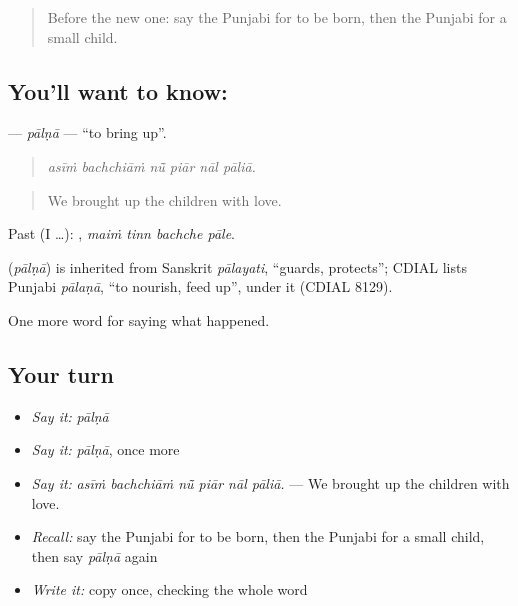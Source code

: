 \label{lesson:PA-C314-palna}



\begin{quote}
Before the new one: say the Punjabi for to be born, then the Punjabi for a small child.
\end{quote}

\subsection*{You'll want to know: }
\textbf{} — \emph{pālṇā} — \textquotedblleft{}to bring up\textquotedblright{}.

\begin{quote}
     
\end{quote}

\begin{quote}
\emph{asīṁ bachchiāṁ nū̃ piār nāl pāliā.}
\end{quote}

\begin{quote}
We brought up the children with love.
\end{quote}

Past (I …):    , \emph{maiṁ tinn bachche pāle}.

\begin{cousinweb}
\textbf{} (\emph{pālṇā}) is inherited from Sanskrit \emph{pālayati}, \textquotedblleft{}guards, protects\textquotedblright{}; CDIAL lists Punjabi \emph{pālaṇā}, \textquotedblleft{}to nourish, feed up\textquotedblright{}, under it (CDIAL 8129).
\end{cousinweb}

\begin{grammarlens}[title={What you've built}]
One more word for saying what happened.
\end{grammarlens}

\subsection*{Your turn}
\begin{itemize}
\raggedright
  \item \emph{Say it:} \emph{pālṇā}
  \item \emph{Say it:} \emph{pālṇā}, once more
  \item \emph{Say it:} \emph{asīṁ bachchiāṁ nū̃ piār nāl pāliā.} — We brought up the children with love.
  \item \emph{Recall:} say the Punjabi for to be born, then the Punjabi for a small child, then say \emph{pālṇā} again
  \item \emph{Write it:} copy \textbf{} once, checking the whole word
\end{itemize}

